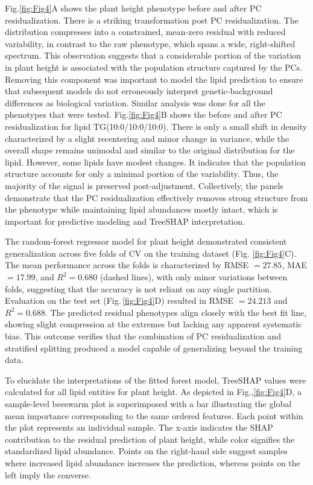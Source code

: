 \documentclass[10pt,letterpaper]{article}
\begin{document}
Fig.\ref{fig:Fig4}A shows the plant height phenotype before and after PC residualization. There is a striking transformation post PC residualization. The distribution compresses into a constrained, mean-zero residual with reduced variability, in contrast to the raw phenotype, which spans a wide, right-shifted spectrum. This observation suggests that a considerable portion of the variation in plant height is associated with the population structure captured by the PCs. Removing this component was important to model the lipid prediction to ensure that subsequent models do not erroneously interpret genetic-background differences as biological variation. Similar analysis was done for all the phenotypes that were tested. Fig.\ref{fig:Fig4}B shows the before and after PC residualization for lipid TG(10:0/10:0/10:0). There is only a small shift in density characterized by a slight recentering and minor change in variance, while the overall shape remains unimodal and similar to the original distribution for the lipid. However, some lipids have modest changes. It indicates that the population structure accounts for only a minimal portion of the variability. Thus, the majority of the signal is preserved post-adjustment. Collectively, the panels demonstrate that the PC residualization effectively removes strong structure from the phenotype while maintaining lipid abundances mostly intact, which is important for predictive modeling and TreeSHAP interpretation.

The random-forest regressor model for plant height demonstrated consistent generalization across five folds of CV on the training dataset (Fig. \ref{fig:Fig4}C). The mean performance across the folds is characterized by RMSE $=27.85$, MAE $=17.99$, and $R^2=0.680$ (dashed lines), with only minor variations between folds, suggesting that the accuracy is not reliant on any single partition. Evaluation on the test set (Fig.\,\ref{fig:Fig4}D) resulted in RMSE $=24.213$ and $R^2=0.688$. The predicted residual phenotypes align closely with the best fit line, showing slight compression at the extremes but lacking any apparent systematic bias. This outcome verifies that the combination of PC residualization and stratified splitting produced a model capable of generalizing beyond the training data.

To elucidate the interpretations of the fitted forest model, TreeSHAP values were calculated for all lipid entities for plant height. As depicted in Fig.,\ref{fig:Fig4}D, a sample-level beeswarm plot is superimposed with a bar illustrating the global mean importance corresponding to the same ordered features. Each point within the plot represents an individual sample. The x-axis indicates the SHAP contribution to the residual prediction of plant height, while color signifies the standardized lipid abundance. Points on the right-hand side suggest samples where increased lipid abundance increases the prediction, whereas points on the left imply the converse. 
\end{document}

